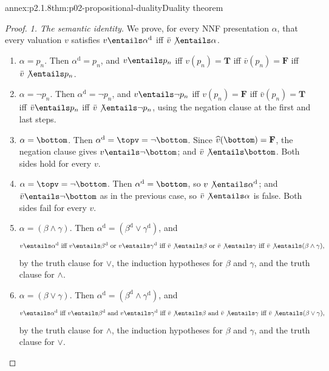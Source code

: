 \begin{annexitem}{annex:p2.1.8}{thm:p02-propositional-duality}{Duality theorem}
\begin{proof}
\emph{1. The semantic identity.}  We prove, for every NNF presentation
\(\alpha\), that every valuation \(v\) satisfies
\(v\entails\alpha^{\mathrm d}\) iff \(\bar v\not\entails\alpha\).
\begin{enumerate}
  \item \(\alpha=p_n\).  Then \(\alpha^{\mathrm d}=p_n\), and
        \(v\entails p_n\) iff \(v(p_n)=\mathbf T\) iff
        \(\bar v(p_n)=\mathbf F\) iff \(\bar v\not\entails p_n\).
  \item \(\alpha=\neg p_n\).  Then \(\alpha^{\mathrm d}=\neg p_n\), and
        \(v\entails\neg p_n\) iff \(v(p_n)=\mathbf F\) iff
        \(\bar v(p_n)=\mathbf T\) iff \(\bar v\entails p_n\) iff
        \(\bar v\not\entails\neg p_n\), using the negation clause at the first
        and last steps.
  \item \(\alpha=\bottom\).  Then \(\alpha^{\mathrm d}=\topv=\neg\bottom\).
        Since \(\widehat v(\bottom)=\mathbf F\), the negation clause gives
        \(v\entails\neg\bottom\); and \(\bar v\not\entails\bottom\).  Both
        sides hold for every \(v\).
  \item \(\alpha=\topv=\neg\bottom\).  Then \(\alpha^{\mathrm d}=\bottom\),
        so \(v\not\entails\alpha^{\mathrm d}\); and \(\bar v\entails\neg\bottom\)
        as in the previous case, so \(\bar v\not\entails\alpha\) is false.  Both
        sides fail for every \(v\).
  \item \(\alpha=(\beta\land\gamma)\).  Then
        \(\alpha^{\mathrm d}=(\beta^{\mathrm d}\lor\gamma^{\mathrm d})\), and
        \[
         v\entails\alpha^{\mathrm d}
         \ \text{iff}\
         v\entails\beta^{\mathrm d}\text{ or }v\entails\gamma^{\mathrm d}
         \ \text{iff}\
         \bar v\not\entails\beta\text{ or }\bar v\not\entails\gamma
         \ \text{iff}\
         \bar v\not\entails(\beta\land\gamma),
        \]
        by the truth clause for \(\lor\), the induction hypotheses for
        \(\beta\) and \(\gamma\), and the truth clause for \(\land\).
  \item \(\alpha=(\beta\lor\gamma)\).  Then
        \(\alpha^{\mathrm d}=(\beta^{\mathrm d}\land\gamma^{\mathrm d})\), and
        \[
         v\entails\alpha^{\mathrm d}
         \ \text{iff}\
         v\entails\beta^{\mathrm d}\text{ and }v\entails\gamma^{\mathrm d}
         \ \text{iff}\
         \bar v\not\entails\beta\text{ and }\bar v\not\entails\gamma
         \ \text{iff}\
         \bar v\not\entails(\beta\lor\gamma),
        \]
        by the truth clause for \(\land\), the induction hypotheses for
        \(\beta\) and \(\gamma\), and the truth clause for \(\lor\).
\end{enumerate}


\end{proof}
\end{annexitem}

